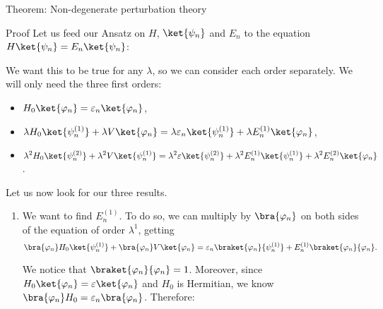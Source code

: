 \documentclass[a4paper]{article}
\begin{document}
\begin{parag}{Theorem: Non-degenerate perturbation theory}
    \begin{subparag}{Proof}
        Let us feed our Ansatz on $H$, $\ket{\psi_n}$ and $E_n$ to the equation $H \ket{\psi_n} = E_n \ket{\psi_n}$: 

        We want this to be true for any $\lambda$, so we can consider each order separately. We will only need the three first orders:
        \begin{itemize}[left=0pt]
            \item $\displaystyle H_0 \ket{\phi_n} = \epsilon_n \ket{\phi_n}$,
            \item $\displaystyle  \lambda H_0 \ket{\psi_n^{\left(1\right)}} + \lambda V \ket{\phi_n}  = \lambda \epsilon_n \ket{\psi_n^{\left(1\right)}} + \lambda E_n^{\left(1\right)} \ket{\phi_n}$, 
            \item \mbox{$\displaystyle \lambda^2 H_0 \ket{\psi_n^{\left(2\right)}} + \lambda^2 V \ket{\psi_n^{\left(1\right)}} = \lambda^2 \epsilon \ket{\psi_n^{\left(2\right)}} + \lambda^2 E_n^{\left(1\right)} \ket{\psi_n^{\left(1\right)}} + \lambda^2 E_n^{\left(2\right)} \ket{\phi_n}$.}
        \end{itemize}

        Let us now look for our three results.
        \begin{enumerate}[left=0pt]
            \item We want to find $E_n^{\left(1\right)}$. To do so, we can multiply by $\bra{\phi_n}$ on both sides of the equation of order $\lambda^1$, getting
        \[\bra{\phi_n} H_0 \ket{\psi_n^{\left(1\right)}} + \bra{\phi_n} V \ket{\phi_n} = \epsilon_n \braket{\phi_n}{\psi_n^{\left(1\right)}} + E_n^{\left(1\right)} \braket{\phi_n}{\phi_n}.\]

        We notice that $\braket{\phi_n}{\phi_n} = 1$. Moreover, since $H_0 \ket{\phi_n} = \epsilon \ket{\phi_n}$ and $H_0$ is Hermitian, we know $\bra{\phi_n} H_0 = \epsilon_n \bra{\phi_n}$. Therefore:


\end{enumerate}
\end{subparag}
\end{parag}
\end{document}
